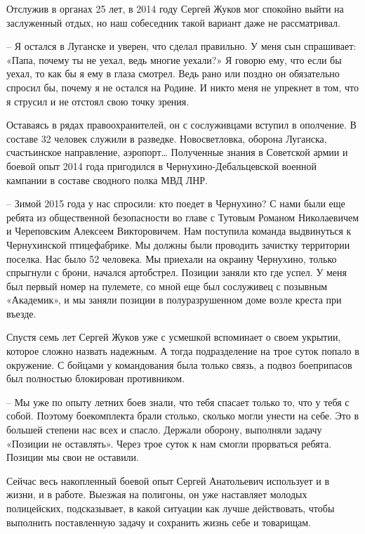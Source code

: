 
Отслужив в органах 25 лет, в 2014 году Сергей Жуков мог спокойно выйти на
заслуженный отдых, но наш собеседник такой вариант даже не рассматривал. 

– Я остался в Луганске и уверен, что сделал правильно. У меня сын спрашивает:
«Папа, почему ты не уехал, ведь многие уехали?» Я говорю ему, что если бы
уехал, то как бы я ему в глаза смотрел. Ведь рано или поздно он обязательно
спросил бы, почему я не остался на Родине. И никто меня не упрекнет в том, что
я струсил и не отстоял свою точку зрения. 

Оставаясь в рядах правоохранителей, он с сослуживцами вступил в ополчение. В
составе 32 человек служили в разведке. Новосветловка, оборона Луганска,
счастьинское направление, аэропорт… Полученные знания в Советской армии и
боевой опыт 2014 года пригодился в Чернухино-Дебальцевской военной кампании в
составе сводного полка МВД ЛНР.

– Зимой 2015 года у нас спросили: кто поедет в Чернухино? С нами были еще
ребята из общественной безопасности во главе с Тутовым Романом Николаевичем и
Череповским Алексеем Викторовичем. Нам поступила команда выдвинуться к
Чернухинской птицефабрике. Мы должны были проводить зачистку территории
поселка. Нас было 52 человека. Мы приехали на окраину Чернухино, только
спрыгнули с брони, начался артобстрел. Позиции заняли кто где успел. У меня был
первый номер на пулемете, со мной еще был сослуживец с позывным «Академик», и
мы заняли позиции в полуразрушенном доме возле креста при въезде. 

Спустя семь лет Сергей Жуков уже с усмешкой вспоминает о своем укрытии, которое
сложно назвать надежным. А тогда подразделение на трое суток попало в
окружение. С бойцами у командования была только связь, а подвоз боеприпасов был
полностью блокирован противником. 

– Мы уже по опыту летних боев знали, что тебя спасает только то, что у тебя с
собой. Поэтому боекомплекта брали столько, сколько могли унести на себе. Это в
большей степени нас всех и спасло. Держали оборону, выполняли задачу «Позиции
не оставлять». Через трое суток к нам смогли прорваться ребята. Позиции мы свои
не оставили.

Сейчас весь накопленный боевой опыт Сергей Анатольевич использует и в жизни, и
в работе. Выезжая на полигоны, он уже наставляет молодых полицейских,
подсказывает, в какой ситуации как лучше действовать, чтобы выполнить
поставленную задачу и сохранить жизнь себе и товарищам.

